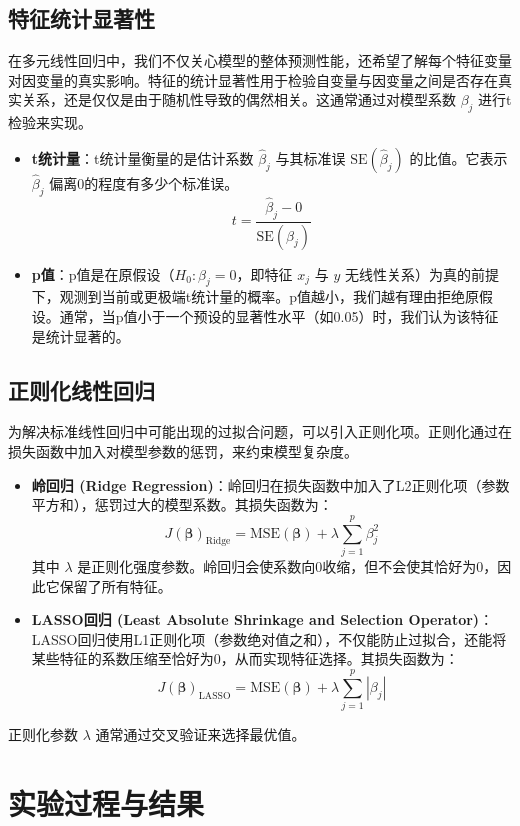 \documentclass[UTF8,a4paper,10pt]{ctexart}
\begin{document}
\subsection{特征统计显著性}
在多元线性回归中，我们不仅关心模型的整体预测性能，还希望了解每个特征变量对因变量的真实影响。特征的统计显著性用于检验自变量与因变量之间是否存在真实关系，还是仅仅是由于随机性导致的偶然相关。这通常通过对模型系数 $\beta_j$ 进行t检验来实现。

\begin{itemize}
    \item \textbf{t统计量}：t统计量衡量的是估计系数 $\hat{\beta}_j$ 与其标准误 $\text{SE}(\hat{\beta}_j)$ 的比值。它表示 $\hat{\beta}_j$ 偏离0的程度有多少个标准误。
    $$
    t = \frac{\hat{\beta}_j - 0}{\text{SE}(\hat{\beta}_j)}
    $$
    \item \textbf{p值}：p值是在原假设（$H_0: \beta_j = 0$，即特征 $x_j$ 与 $y$ 无线性关系）为真的前提下，观测到当前或更极端t统计量的概率。p值越小，我们越有理由拒绝原假设。通常，当p值小于一个预设的显著性水平（如0.05）时，我们认为该特征是统计显著的。
\end{itemize}

\subsection{正则化线性回归}
为解决标准线性回归中可能出现的过拟合问题，可以引入正则化项。正则化通过在损失函数中加入对模型参数的惩罚，来约束模型复杂度。
\begin{itemize}
    \item \textbf{岭回归 (Ridge Regression)}：岭回归在损失函数中加入了L2正则化项（参数平方和），惩罚过大的模型系数。其损失函数为：
    $$
    J(\boldsymbol{\beta})_{\text{Ridge}} = \text{MSE}(\boldsymbol{\beta}) + \lambda \sum_{j=1}^{p} \beta_j^2
    $$
    其中 $\lambda$ 是正则化强度参数。岭回归会使系数向0收缩，但不会使其恰好为0，因此它保留了所有特征。

    \item \textbf{LASSO回归 (Least Absolute Shrinkage and Selection Operator)}：LASSO回归使用L1正则化项（参数绝对值之和），不仅能防止过拟合，还能将某些特征的系数压缩至恰好为0，从而实现特征选择。其损失函数为：
    $$
    J(\boldsymbol{\beta})_{\text{LASSO}} = \text{MSE}(\boldsymbol{\beta}) + \lambda \sum_{j=1}^{p} |\beta_j|
    $$
\end{itemize}
正则化参数 $\lambda$ 通常通过交叉验证来选择最优值。


\section{实验过程与结果}
\end{document}
